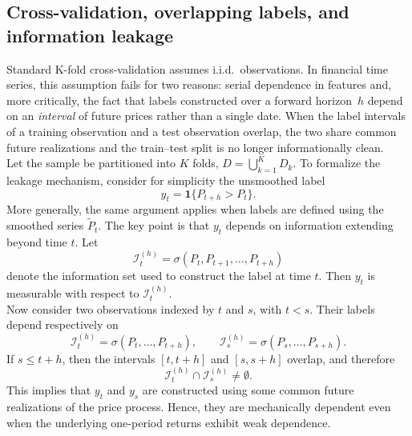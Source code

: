 \documentclass{rQUF2e}
\begin{document}
\subsection{Cross-validation, overlapping labels, and information leakage}

Standard K-fold cross-validation assumes i.i.d.\ observations. In financial time series, this assumption fails for two reasons: serial dependence in features and, more critically, the fact that labels constructed over a forward horizon~$h$ depend on an \emph{interval} of future prices rather than a single date. When the label intervals of a training observation and a test observation overlap, the two share common future realizations and the train--test split is no longer informationally clean. \\

\noindent Let the sample be partitioned into $K$ folds, $D = \bigcup_{k=1}^{K} D_k$. To formalize the leakage mechanism, consider for simplicity the unsmoothed label
\begin{equation}
y_t = \mathbf{1}\{P_{t+h} > P_t\}.
\end{equation}
\noindent More generally, the same argument applies when labels are defined using the smoothed series \(\tilde{P}_t\). The key point is that \(y_t\) depends on information extending beyond time \(t\). Let
\begin{equation}
\mathcal{I}_t^{(h)} = \sigma(P_t,P_{t+1},\dots,P_{t+h})
\end{equation}
\noindent denote the information set used to construct the label at time \(t\). Then \(y_t\) is measurable with respect to \(\mathcal{I}_t^{(h)}\). \\

\noindent Now consider two observations indexed by \(t\) and \(s\), with \(t < s\). Their labels depend respectively on
\begin{equation}
\mathcal{I}_t^{(h)} = \sigma(P_t,\dots,P_{t+h}),
\qquad
\mathcal{I}_s^{(h)} = \sigma(P_s,\dots,P_{s+h}).
\end{equation}
If \(s \leq t+h\), then the intervals \([t,t+h]\) and \([s,s+h]\) overlap, and therefore
\begin{equation}
\mathcal{I}_t^{(h)} \cap \mathcal{I}_s^{(h)} \neq \emptyset.
\end{equation}
This implies that \(y_t\) and \(y_s\) are constructed using some common future realizations of the price process. Hence, they are mechanically dependent even when the underlying one-period returns exhibit weak dependence. \\
\end{document}

